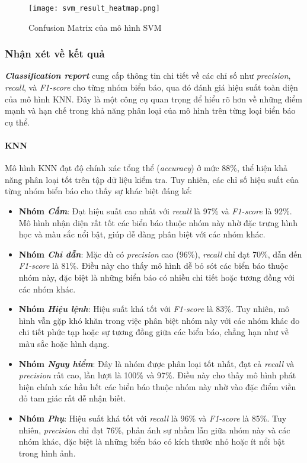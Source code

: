 \documentclass[a4paper,12pt]{article}
\begin{document}
\begin{figure}[H]
    \centering
    \texttt{[image: svm\_result\_heatmap.png]}
    \caption{Confusion Matrix của mô hình SVM}
    \label{fig:svm_confusion_matrix}
\end{figure}

\subsubsection{Nhận xét về kết quả}

\textbf{\textit{Classification report}} cung cấp thông tin chi tiết về các chỉ số như \textit{precision}, \textit{recall}, và \textit{F1-score} cho từng nhóm biển báo, qua đó đánh giá hiệu suất toàn diện của mô hình KNN. Đây là một công cụ quan trọng để hiểu rõ hơn về những điểm mạnh và hạn chế trong khả năng phân loại của mô hình trên từng loại biển báo cụ thể.  

\paragraph{KNN}  
Mô hình KNN đạt độ chính xác tổng thể (\textit{accuracy}) ở mức 88\%, thể hiện khả năng phân loại tốt trên tập dữ liệu kiểm tra. Tuy nhiên, các chỉ số hiệu suất của từng nhóm biển báo cho thấy sự khác biệt đáng kể:  
\begin{itemize}
    \item \textbf{Nhóm \textit{Cấm}}: Đạt hiệu suất cao nhất với \textit{recall} là 97\% và \textit{F1-score} là 92\%. Mô hình nhận diện rất tốt các biển báo thuộc nhóm này nhờ đặc trưng hình học và màu sắc nổi bật, giúp dễ dàng phân biệt với các nhóm khác.  
    \item \textbf{Nhóm \textit{Chỉ dẫn}}: Mặc dù có \textit{precision} cao (96\%), \textit{recall} chỉ đạt 70\%, dẫn đến \textit{F1-score} là 81\%. Điều này cho thấy mô hình dễ bỏ sót các biển báo thuộc nhóm này, đặc biệt là những biển báo có nhiều chi tiết hoặc tương đồng với các nhóm khác.  
    \item \textbf{Nhóm \textit{Hiệu lệnh}}: Hiệu suất khá tốt với \textit{F1-score} là 83\%. Tuy nhiên, mô hình vẫn gặp khó khăn trong việc phân biệt nhóm này với các nhóm khác do chi tiết phức tạp hoặc sự tương đồng giữa các biển báo, chẳng hạn như về màu sắc hoặc hình dạng.  
    \item \textbf{Nhóm \textit{Nguy hiểm}}: Đây là nhóm được phân loại tốt nhất, đạt cả \textit{recall} và \textit{precision} rất cao, lần lượt là 100\% và 97\%. Điều này cho thấy mô hình phát hiện chính xác hầu hết các biển báo thuộc nhóm này nhờ vào đặc điểm viền đỏ tam giác rất dễ nhận biết.  
    \item \textbf{Nhóm \textit{Phụ}}: Hiệu suất khá tốt với \textit{recall} là 96\% và \textit{F1-score} là 85\%. Tuy nhiên, \textit{precision} chỉ đạt 76\%, phản ánh sự nhầm lẫn giữa nhóm này và các nhóm khác, đặc biệt là những biển báo có kích thước nhỏ hoặc ít nổi bật trong hình ảnh.  
\end{itemize}
\end{document}
